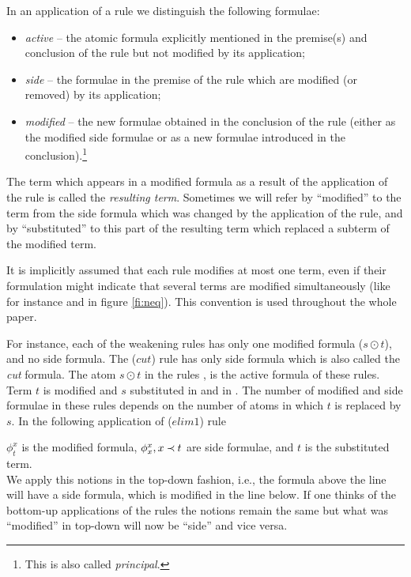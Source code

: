 \begin{DEFINITION} In an application of a rule we distinguish the following
formulae:
\begin{itemize}\MyLPar
\item {\em active} -- the atomic formula explicitly mentioned in the premise(s)
and conclusion of the rule but not modified by its application;
\item {\em side} -- the formulae in the premise of the rule which are modified
(or removed) by its application;
\item {\em modified} -- the new formulae obtained in the conclusion of the rule
(either as the modified side formulae or as a new formulae introduced in the 
conclusion).\footnote{This is also called {\em principal}.}
\end{itemize}
\end{DEFINITION}
\noindent
The term which appears in a modified formula as a 
result of the application of the rule is called the {\em resulting
term}. Sometimes we will refer by ``modified'' to the term from the side
formula which was changed by the application of the rule, and by ``substituted'' to
this part of the resulting term which replaced a subterm of the modified term.

It is implicitly assumed that each rule modifies at most one term, even if
their formulation might indicate that several terms are modified
simultaneously (like for instance  and  in figure \ref{fi:neq}). This
convention is used throughout the whole paper.
\begin{EXAMPLE}
For instance, each of the weakening rules 
has only one modified formula ($s\odot t$), and no side formula.
The ($cut$) rule  has only side formula which is
also called the {\em cut} formula. The atom $s\odot t$ in the rules , 
 is the active formula of these rules. 
Term $t$ is modified and $s$ substituted in
 and in . The number of modified and side formulae in
these rules depends on the number of atoms in which $t$ is replaced by $s$. 
In the following application of ($elim1$) rule 
\begin{center}
\end{center}
\noindent $\phi_t^x$ is the modified formula, $\phi_x^x, x\mathbin{\prec} t$ are side formulae, 
and $t$ is the substituted term.\\
We apply this notions in the top-down fashion, i.e., the formula above the
line will have a side formula, which is modified in the line below.
If one thinks of the bottom-up applications of the rules the notions remain the same but
what was ``modified'' in top-down will now be ``side'' and vice versa.
\end{EXAMPLE}

